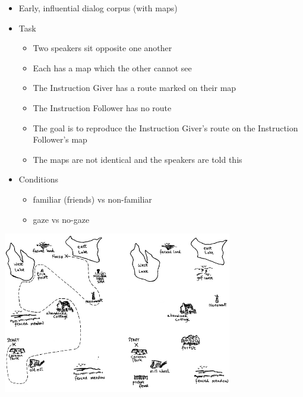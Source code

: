 \documentclass[a4paper,landscape,headrule,footrule,xetex]{foils}
\begin{document}
\begin{itemize}
\item Early, influential dialog corpus (with maps)
\item Task
  \begin{itemize}
  \item Two speakers sit opposite one another
  \item Each has a map which the other cannot see
  \item The Instruction Giver has a route marked on their map
  \item The Instruction Follower has no route
  \item The goal is to reproduce the Instruction Giver's route on the Instruction Follower's map
  \item The maps are not identical and the speakers are told this
  \end{itemize}
\item Conditions
  \begin{itemize}
  \item familiar (friends) vs non-familiar
  \item gaze vs no-gaze
  \end{itemize}
\end{itemize}


\begin{center}
  \includegraphics[width=0.75\textwidth]{include/maps}
\end{center}

\end{document}
